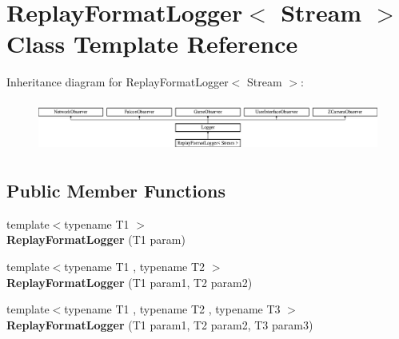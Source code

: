 \hypertarget{classReplayFormatLogger}{
\section{ReplayFormatLogger$<$ Stream $>$ Class Template Reference}
\label{classReplayFormatLogger}
}
Inheritance diagram for ReplayFormatLogger$<$ Stream $>$:\begin{figure}[H]
\begin{center}
\leavevmode
\includegraphics[height=1.67164cm]{classReplayFormatLogger}
\end{center}
\end{figure}
\subsection*{Public Member Functions}
\begin{DoxyCompactItemize}
\item 
\hypertarget{classReplayFormatLogger_a63a0043e0c400decedb7403780901159}{
{\footnotesize template$<$typename T1 $>$ }\\{\bfseries ReplayFormatLogger} (T1 param)}
\label{classReplayFormatLogger_a63a0043e0c400decedb7403780901159}

\item 
\hypertarget{classReplayFormatLogger_a2a048b2c87b25c64ed95fa9c6904ff61}{
{\footnotesize template$<$typename T1 , typename T2 $>$ }\\{\bfseries ReplayFormatLogger} (T1 param1, T2 param2)}
\label{classReplayFormatLogger_a2a048b2c87b25c64ed95fa9c6904ff61}

\item 
\hypertarget{classReplayFormatLogger_a767584e0a4ada86bf9012bd3279a77ac}{
{\footnotesize template$<$typename T1 , typename T2 , typename T3 $>$ }\\{\bfseries ReplayFormatLogger} (T1 param1, T2 param2, T3 param3)}
\label{classReplayFormatLogger_a767584e0a4ada86bf9012bd3279a77ac}

\end{DoxyCompactItemize}
